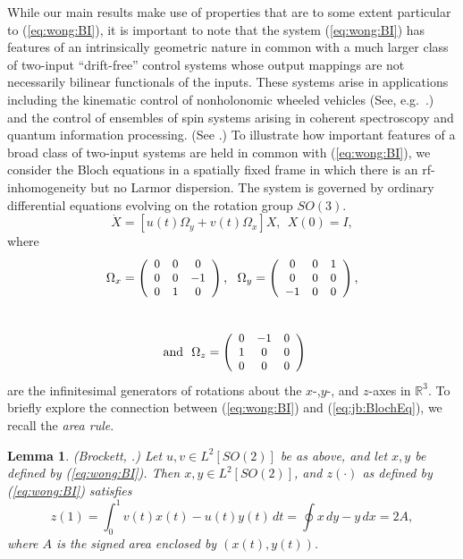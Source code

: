 \documentclass[12pt,onecolumn,draftcls]{IEEEtran}
\newtheorem{lemma}{Lemma}[section]
\begin{document}
While our main results make use 
of properties that are to some extent particular to (\ref{eq:wong:BI}), it is important to note that the system (\ref{eq:wong:BI}) has features of
an intrinsically geometric nature in common with a much larger class of two-input ``drift-free'' control systems whose output mappings are not necessarily bilinear functionals of the inputs.  These systems arise in applications including the kinematic control of nonholonomic wheeled vehicles (See, e.g.\ \cite{LeonardKrishna}.) and the control of ensembles of spin systems arising in coherent spectroscopy and quantum information processing. (See \cite{LiKhan2}.) 
To illustrate how important features of a broad class of two-input systems are held in common with (\ref{eq:wong:BI}), we consider the Bloch equations in a spatially fixed frame in which there is an rf-inhomogeneity but no Larmor dispersion.  The system is governed by ordinary
differential equations evolving on the rotation group $SO(3)$.
\begin{equation}
\dot X = [u(t)\Omega_y + v(t)\Omega_x] X, \ \ X(0)=I,
\label{eq:jb:BlochEq}
\end{equation}
where
\[
\Omega_x=\left(
\small
\begin{array}{ccc}
0&0&0\\
0&0&-1\\
0&1&0\end{array}\right),\ \ 
\Omega_y=\left(
\small
\begin{array}{ccc}
0&0&1\\
0&0&0\\
-1&0&0\end{array}\right),\]\\
\[ \ {\rm and}\ \
\Omega_z=\left(
\small
\begin{array}{ccc}
0&-1&0\\
1&0&0\\
0&0&0\end{array}\right)
\]
are the infinitesimal generators of rotations about the $x$-,$y$-, and $z$-axes in $\mathbb{R}^3$.  
To briefly explore the connection between (\ref{eq:wong:BI}) and (\ref{eq:jb:BlochEq}), we recall the {\em area rule}.

\medskip
\begin{lemma} {\rm (Brockett, \cite{rwb3}.)} Let $u,v\in L^2[SO(2)]$ be as above, and let $x,y$ be defined by (\ref{eq:wong:BI}).  Then $x,y\in L^2[SO(2)]$, and $z(\cdot)$ as defined by (\ref{eq:wong:BI}) satisfies 
\[
z(1) = \int_0^1 v(t)x(t)-u(t)y(t)\,dt = \oint x\,dy-y\,dx = 2A,
\]
where $A$ is the signed area enclosed by $(x(t),y(t))$.
\label{thm:jb:Area}
\end{lemma}
\end{document}
